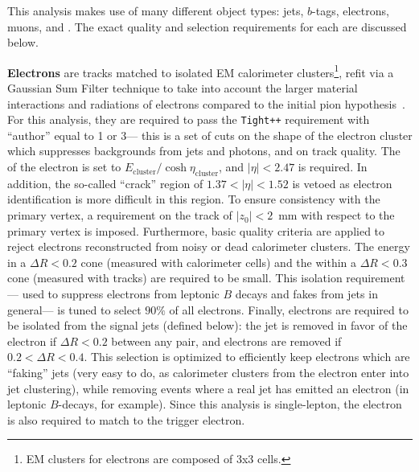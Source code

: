This analysis makes use of many different object types: jets, $b$-tags, electrons, muons, and \met. The exact quality and selection requirements for each are discussed below.

\textbf{Electrons} are tracks matched to isolated EM calorimeter clusters\footnote{EM clusters for electrons are composed of 3x3 cells.}, refit via a Gaussian Sum Filter technique to take into account the larger material interactions and radiations of electrons compared to the initial pion hypothesis~. For this analysis, they are required to pass the \texttt{Tight++} requirement with ``author'' equal to 1 or 3--- this is a set of cuts on the shape of the electron cluster which suppresses backgrounds from jets and photons, and on track quality. The \pt of the electron is set to $E_\mathrm{cluster} / \cosh \eta_\mathrm{cluster}$, and $|\eta| < 2.47$ is required. In addition, the so-called ``crack'' region of $1.37 < |\eta| < 1.52$ is vetoed as electron identification is more difficult in this region. To ensure consistency with the primary vertex, a requirement on the track of $|z_0| < 2$~mm with respect to the primary vertex is imposed. Furthermore, basic quality criteria are applied to reject electrons reconstructed from noisy or dead calorimeter clusters. The energy in a $\Delta R < 0.2$ cone (measured with calorimeter cells) and the \pt within a $\Delta R < 0.3$ cone (measured with tracks) are required to be small. This isolation requirement--- used to suppress electrons from leptonic $B$ decays and fakes from jets in general--- is tuned to select $90\%$ of all electrons. Finally, electrons are required to be isolated from the signal jets (defined below): the jet is removed in favor of the electron if $\Delta R < 0.2$ between any pair, and electrons are removed if $0.2 < \Delta R < 0.4$. This selection is optimized to efficiently keep electrons which are ``faking'' jets (very easy to do, as calorimeter clusters from the electron enter into jet clustering), while removing events where a real jet has emitted an electron (in leptonic $B$-decays, for example). Since this analysis is single-lepton, the electron is also required to match to the trigger electron.

